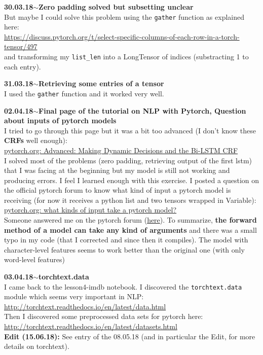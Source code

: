\documentclass[11pt,a4paper]{article}
\newenvironment{loggentry}[2]%
{\noindent\textbf{#1}\hspace{1cm}$\mathbf{\sim}$\text{ }\textbf{#2}\\}{\vspace{0.5cm}}
\begin{document}
\begin{loggentry}{30.03.18}{Zero padding solved but subsetting unclear}
But maybe I could solve this problem using the \texttt{gather} function as explained here:\\
\url{https://discuss.pytorch.org/t/select-specific-columns-of-each-row-in-a-torch-tensor/497}\\
and transforming my \texttt{list\_len} into a LongTensor of indices (substracting 1 to each entry).
\end{loggentry}

\begin{loggentry}{31.03.18}{Retrieving some entries of a tensor}
I used the \texttt{gather} function and it worked very well.
\end{loggentry}

\begin{loggentry}{02.04.18}{Final page of the tutorial on NLP with Pytorch, Question about inputs of pytorch models}
I tried to go through this page but it was a bit too advanced (I don't know these \textbf{CRFs} well enough):\\
\href{http://pytorch.org/tutorials/beginner/nlp/advanced_tutorial.html}{pytorch.org: Advanced: Making Dynamic Decisions and the Bi-LSTM CRF}\\
I solved most of the problems (zero padding, retrieving output of the first lstm) that I was facing at the beginning but my model is still not working and producing errors. I feel I learned enough with this exercise. I posted a question on the official pytorch forum to know what kind of input a pytorch model is receiving (for now it receives a python list and two tensors wrapped in Variable):\\
\href{https://discuss.pytorch.org/t/what-kinds-of-input-take-a-pytorch-model/15823}{pytorch.org: what kinds of input take a pytorch model?}\\
Someone answered me on the pytorch forum (\href{https://discuss.pytorch.org/t/what-kinds-of-input-take-a-pytorch-model/15823/4}{here}). To summarize, \textbf{the forward method of a model can take any kind of arguments} and there was a small typo in my code (that I corrected and since then it compiles). The model with character-level features seems to work better than the original one (with only word-level features)
\end{loggentry}

\begin{loggentry}{03.04.18}{torchtext.data}
I came back to the lesson4-imdb notebook. I discovered the \texttt{torchtext.data} module which seems very important in NLP:\\
\url{http://torchtext.readthedocs.io/en/latest/data.html}\\
Then I discovered some preprocessed data sets for pytorch here:\\
\url{http://torchtext.readthedocs.io/en/latest/datasets.html}\\
\textbf{Edit (15.06.18):} See entry of the 08.05.18 (and in particular the Edit, for more details on torchtext).
\end{loggentry}
\end{document}
